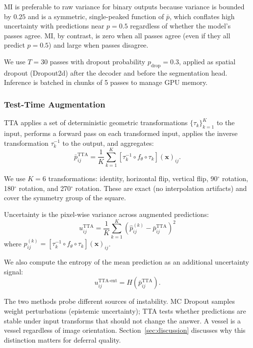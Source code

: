 MI is preferable to raw variance for binary outputs because variance is bounded
by $0.25$ and is a symmetric, single-peaked function of $\bar{p}$, which
conflates high uncertainty with predictions near $p = 0.5$ regardless of
whether the model's passes agree. MI, by contrast, is zero when all passes
agree (even if they all predict $p = 0.5$) and large when passes disagree.

We use $T = 30$ passes with dropout probability $p_{\text{drop}} = 0.3$,
applied as spatial dropout (Dropout2d) after the decoder and before the
segmentation head. Inference is batched in chunks of 5 passes to manage GPU
memory.

\subsubsection{Test-Time Augmentation}

TTA applies a set of deterministic geometric transformations
$\{\tau_k\}_{k=1}^{K}$ to the input, performs a forward pass on each
transformed input, applies the inverse transformation $\tau_k^{-1}$ to the
output, and aggregates:
\begin{equation}
  \bar{p}_{ij}^{\text{TTA}} = \frac{1}{K} \sum_{k=1}^{K} \left[\tau_k^{-1}
  \circ f_\theta \circ \tau_k\right](\mathbf{x})_{ij}.
  \label{eq:tta_mean}
\end{equation}

We use $K = 6$ transformations: identity, horizontal flip, vertical flip,
90$^\circ$ rotation, 180$^\circ$ rotation, and 270$^\circ$ rotation. These
are exact (no interpolation artifacts) and cover the symmetry group of
the square.

Uncertainty is the pixel-wise variance across augmented predictions:
\begin{equation}
  u_{ij}^{\text{TTA}} = \frac{1}{K} \sum_{k=1}^{K} \left(\hat{p}_{ij}^{(k)} -
  \bar{p}_{ij}^{\text{TTA}}\right)^2
  \label{eq:tta_var}
\end{equation}
where $\hat{p}_{ij}^{(k)} = [\tau_k^{-1} \circ f_\theta \circ
\tau_k](\mathbf{x})_{ij}$.

We also compute the entropy of the mean prediction as an additional uncertainty
signal:
\begin{equation}
  u_{ij}^{\text{TTA-ent}} = H(\bar{p}_{ij}^{\text{TTA}}).
  \label{eq:tta_entropy}
\end{equation}

The two methods probe different sources of instability. MC Dropout samples
weight perturbations (epistemic uncertainty); TTA tests whether predictions
are stable under input transforms that should not change the answer. A
vessel is a vessel regardless of image orientation. Section~\ref{sec:discussion}
discusses why this distinction matters for deferral quality.

